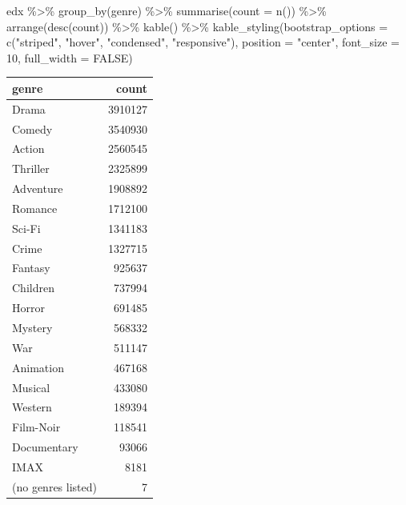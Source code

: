 \documentclass[
]{article}
\newenvironment{Shaded}{}{}
\newcommand{\AttributeTok}[1]{\textcolor[rgb]{0.49,0.56,0.16}{#1}}
\newcommand{\ConstantTok}[1]{\textcolor[rgb]{0.53,0.00,0.00}{#1}}
\newcommand{\DecValTok}[1]{\textcolor[rgb]{0.25,0.63,0.44}{#1}}
\newcommand{\FunctionTok}[1]{\textcolor[rgb]{0.02,0.16,0.49}{#1}}
\newcommand{\NormalTok}[1]{#1}
\newcommand{\SpecialCharTok}[1]{\textcolor[rgb]{0.25,0.44,0.63}{#1}}
\newcommand{\StringTok}[1]{\textcolor[rgb]{0.25,0.44,0.63}{#1}}
\begin{document}
\begin{Shaded}
\begin{Highlighting}[]
\NormalTok{edx }\SpecialCharTok{\%\textgreater{}\%}
   \FunctionTok{group\_by}\NormalTok{(genre) }\SpecialCharTok{\%\textgreater{}\%}
   \FunctionTok{summarise}\NormalTok{(}\AttributeTok{count =} \FunctionTok{n}\NormalTok{()) }\SpecialCharTok{\%\textgreater{}\%}
   \FunctionTok{arrange}\NormalTok{(}\FunctionTok{desc}\NormalTok{(count)) }\SpecialCharTok{\%\textgreater{}\%}
   \FunctionTok{kable}\NormalTok{() }\SpecialCharTok{\%\textgreater{}\%}
   \FunctionTok{kable\_styling}\NormalTok{(}\AttributeTok{bootstrap\_options =} \FunctionTok{c}\NormalTok{(}\StringTok{"striped"}\NormalTok{, }\StringTok{"hover"}\NormalTok{, }\StringTok{"condensed"}\NormalTok{, }\StringTok{"responsive"}\NormalTok{),}
                 \AttributeTok{position =} \StringTok{"center"}\NormalTok{,}
                 \AttributeTok{font\_size =} \DecValTok{10}\NormalTok{,}
                 \AttributeTok{full\_width =} \ConstantTok{FALSE}\NormalTok{)}
\end{Highlighting}
\end{Shaded}

\begin{table}
\centering\begingroup\fontsize{10}{12}\selectfont

\begin{tabular}{l|r}
\hline
genre & count\\
\hline
Drama & 3910127\\
\hline
Comedy & 3540930\\
\hline
Action & 2560545\\
\hline
Thriller & 2325899\\
\hline
Adventure & 1908892\\
\hline
Romance & 1712100\\
\hline
Sci-Fi & 1341183\\
\hline
Crime & 1327715\\
\hline
Fantasy & 925637\\
\hline
Children & 737994\\
\hline
Horror & 691485\\
\hline
Mystery & 568332\\
\hline
War & 511147\\
\hline
Animation & 467168\\
\hline
Musical & 433080\\
\hline
Western & 189394\\
\hline
Film-Noir & 118541\\
\hline
Documentary & 93066\\
\hline
IMAX & 8181\\
\hline
(no genres listed) & 7\\
\hline
\end{tabular}
\endgroup{}
\end{table}
\end{document}
